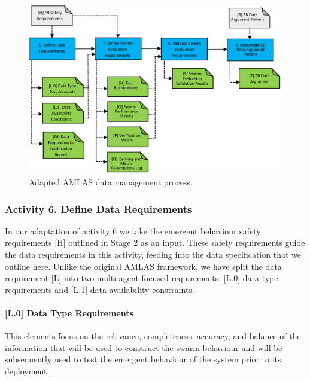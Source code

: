 \documentclass[lettersize,journal]{IEEEtran}
\begin{document}
\begin{figure}
	\centering
	\includegraphics[width=1.0\textwidth]{figures/Stage3_DM.png}
	\caption{Adapted AMLAS data management process.}
	\label{amlas-a-stage3}
\end{figure}

\subsubsection*{Activity 6. Define Data Requirements}


In our adaptation of activity 6 we take the emergent behaviour safety requirements [H] outlined in Stage 2 as an input. These safety requirements guide the data requirements in this activity, feeding into the data specification that we outline here. Unlike the original AMLAS framework, we have split the data requirement [L] into two multi-agent focused requirements: [L.0] data type requirements and [L.1] data availability constraints.

\paragraph*{[L.0] Data Type Requirements}

This elements focus on the relevance, completeness, accuracy, and balance of the information that will be used to construct the swarm behaviour and will be subsequently used to test the emergent behaviour of the system prior to its deployment.
\end{document}
